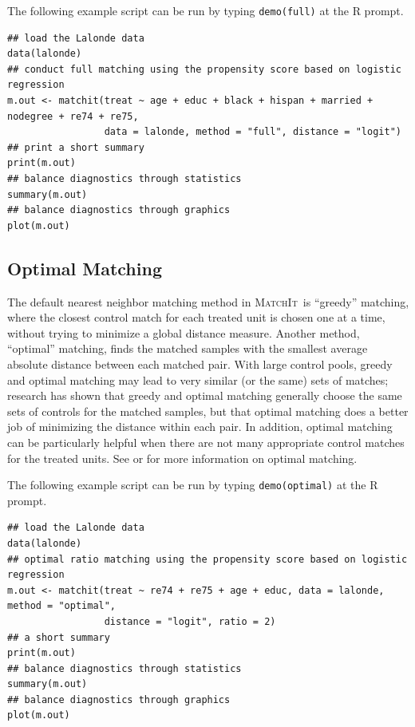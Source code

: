 \documentclass[oneside,letterpaper,titlepage]{article}
\newcommand{\MatchIt}{\textsc{MatchIt}}
\begin{document}
The following example script can be run by typing {\tt demo(full)} at
the R prompt.

\begin{verbatim}
## load the Lalonde data
data(lalonde)
## conduct full matching using the propensity score based on logistic regression
m.out <- matchit(treat ~ age + educ + black + hispan + married + nodegree + re74 + re75, 
                 data = lalonde, method = "full", distance = "logit")
## print a short summary
print(m.out)
## balance diagnostics through statistics
summary(m.out)
## balance diagnostics through graphics
plot(m.out)
\end{verbatim}



\subsection{Optimal Matching}
\label{optmatch}

The default nearest neighbor matching method in \MatchIt\ is
``greedy'' matching, where the closest control match for each treated
unit is chosen one at a time, without trying to minimize a global
distance measure.  Another method, ``optimal'' matching, finds the
matched samples with the smallest average absolute 
distance between each matched pair.  With large control pools, greedy
and optimal matching may lead to very similar (or the same) sets of
matches; research \citep{GuRos93} has shown that greedy and optimal
matching generally choose the same sets of controls for the matched
samples, but that optimal matching does a better job of minimizing the
distance within each pair.  In addition, optimal
matching can be particularly helpful when there are not many
appropriate control matches for the treated units.  See \cite{GuRos93}
or \cite{Rosenbaum02} for more information on optimal matching.

The following example script can be run by typing {\tt demo(optimal)}
at the R prompt.

\begin{verbatim}
## load the Lalonde data
data(lalonde)
## optimal ratio matching using the propensity score based on logistic regression
m.out <- matchit(treat ~ re74 + re75 + age + educ, data = lalonde, method = "optimal", 
                 distance = "logit", ratio = 2)
## a short summary
print(m.out)
## balance diagnostics through statistics
summary(m.out)
## balance diagnostics through graphics
plot(m.out)
\end{verbatim}
\end{document}
